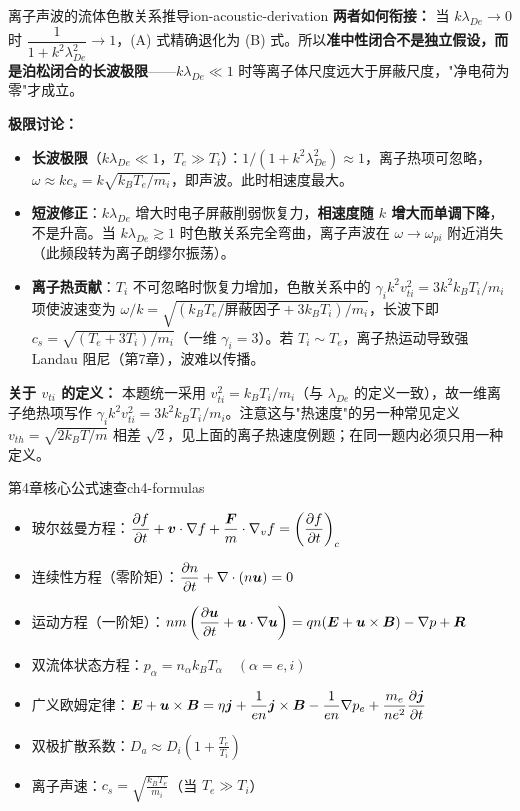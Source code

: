 \begin{example}{离子声波的流体色散关系推导}{ion-acoustic-derivation}
\smallskip
\textbf{两者如何衔接：} 当 $k\lambda_{De}\to0$ 时 $\dfrac{1}{1+k^2\lambda_{De}^2}\to1$，(A) 式精确退化为 (B) 式。所以\textbf{准中性闭合不是独立假设，而是泊松闭合的长波极限}——$k\lambda_{De}\ll1$ 时等离子体尺度远大于屏蔽尺度，"净电荷为零"才成立。

\textbf{极限讨论：}
\begin{itemize}[leftmargin=*,itemsep=0pt]
\item \textbf{长波极限}（$k\lambda_{De}\ll1$，$T_e\gg T_i$）：$1/(1+k^2\lambda_{De}^2)\approx1$，离子热项可忽略，$\omega \approx kc_s = k\sqrt{k_{\!B}T_e/m_i}$，即声波。此时相速度最大。
\item \textbf{短波修正}：$k\lambda_{De}$ 增大时电子屏蔽削弱恢复力，\textbf{相速度随 $k$ 增大而单调下降}，不是升高。当 $k\lambda_{De}\gtrsim1$ 时色散关系完全弯曲，离子声波在 $\omega\to\omega_{pi}$ 附近消失（此频段转为离子朗缪尔振荡）。
\item \textbf{离子热贡献}：$T_i$ 不可忽略时恢复力增加，色散关系中的 $\gamma_i k^2v_{ti}^2=3k^2k_{\!B}T_i/m_i$ 项使波速变为 $\omega/k=\sqrt{(k_{\!B}T_e/\text{屏蔽因子}+3k_{\!B}T_i)/m_i}$，长波下即 $c_s=\sqrt{(T_e+3T_i)/m_i}$（一维 $\gamma_i=3$）。若 $T_i\sim T_e$，离子热运动导致强 Landau 阻尼（第7章），波难以传播。
\end{itemize}

\textbf{关于 $v_{ti}$ 的定义：} 本题统一采用 $v_{ti}^2=k_{\!B}T_i/m_i$（与 $\lambda_{De}$ 的定义一致），故一维离子绝热项写作 $\gamma_i k^2v_{ti}^2=3k^2k_{\!B}T_i/m_i$。注意这与"热速度"的另一种常见定义 $v_{th}=\sqrt{2k_{\!B}T/m}$ 相差 $\sqrt2$，见上面的离子热速度例题；在同一题内必须只用一种定义。
\end{example}

\begin{formulabox}{第4章核心公式速查}{ch4-formulas}
\begin{itemize}[leftmargin=*,itemsep=0pt]
\item 玻尔兹曼方程：$\displaystyle\frac{\partial f}{\partial t} + \bm{v}\cdot\nabla f + \frac{\bm{F}}{m}\cdot\nabla_v f = \left(\frac{\partial f}{\partial t}\right)_c$
\item 连续性方程（零阶矩）：$\displaystyle\frac{\partial n}{\partial t} + \nabla\cdot(n\bm{u}) = 0$
\item 运动方程（一阶矩）：$\displaystyle nm\left(\frac{\partial\bm{u}}{\partial t} + \bm{u}\cdot\nabla\bm{u}\right) = qn(\bm{E}+\bm{u}\times\bm{B}) - \nabla p + \bm{R}$
\item 双流体状态方程：$\displaystyle p_\alpha = n_\alpha k_{\!B}T_\alpha\quad(\alpha=e,i)$
\item 广义欧姆定律：$\displaystyle\bm{E} + \bm{u}\times\bm{B} = \eta\bm{j} + \frac{1}{en}\bm{j}\times\bm{B} - \frac{1}{en}\nabla p_e + \frac{m_e}{ne^2}\frac{\partial\bm{j}}{\partial t}$
\item 双极扩散系数：$\displaystyle D_a \approx D_i\left(1 + \frac{T_e}{T_i}\right)$
\item 离子声速：$\displaystyle c_s = \sqrt{\frac{k_{\!B}T_e}{m_i}}$（当 $T_e\gg T_i$）
\end{itemize}
\end{formulabox}


